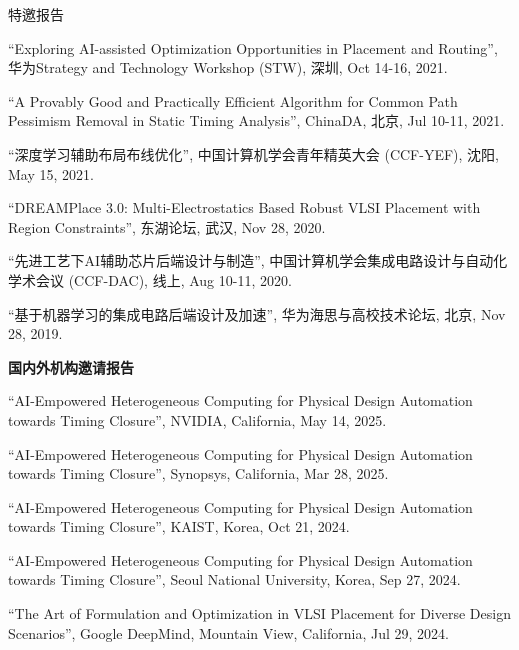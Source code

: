 \begin{rSection}{特邀报告}
\begin{description}[font=\normalfont]
\item[{[6]}]{
``Exploring AI-assisted Optimization Opportunities in Placement and Routing'', 华为Strategy and Technology Workshop (STW), 深圳, Oct 14-16, 2021. 
}

\item[{[5]}]{
``A Provably Good and Practically Efficient Algorithm for Common Path Pessimism Removal in Static Timing Analysis'', ChinaDA, 北京, Jul 10-11, 2021. 
}

\item[{[4]}]{
``深度学习辅助布局布线优化'', 中国计算机学会青年精英大会 (CCF-YEF), 沈阳, May 15, 2021. 
}

\item[{[3]}]{
``DREAMPlace 3.0: Multi-Electrostatics Based Robust VLSI Placement with Region Constraints'', 东湖论坛, 武汉, Nov 28, 2020.
}

\item[{[2]}]{
``先进工艺下AI辅助芯片后端设计与制造'', 中国计算机学会集成电路设计与自动化学术会议 (CCF-DAC), 线上, Aug 10-11, 2020. 
}

\item[{[1]}]{
``基于机器学习的集成电路后端设计及加速'', 华为海思与高校技术论坛, 北京, Nov 28, 2019. 
}

\end{description}

\textbf{国内外机构邀请报告}
        
\begin{description}[font=\normalfont]

\item[{[15]}]{
``AI-Empowered Heterogeneous Computing for Physical Design Automation towards Timing Closure'', NVIDIA, California, May 14, 2025. 
}

\item[{[14]}]{
``AI-Empowered Heterogeneous Computing for Physical Design Automation towards Timing Closure'', Synopsys, California, Mar 28, 2025. 
}

\item[{[13]}]{
``AI-Empowered Heterogeneous Computing for Physical Design Automation towards Timing Closure'', KAIST, Korea, Oct 21, 2024. 
}

\item[{[12]}]{
``AI-Empowered Heterogeneous Computing for Physical Design Automation towards Timing Closure'', Seoul National University, Korea, Sep 27, 2024. 
}

\item[{[11]}]{
``The Art of Formulation and Optimization in VLSI Placement for Diverse Design Scenarios'', Google DeepMind, Mountain View, California, Jul 29, 2024. 
}


\end{description}
\end{rSection}
